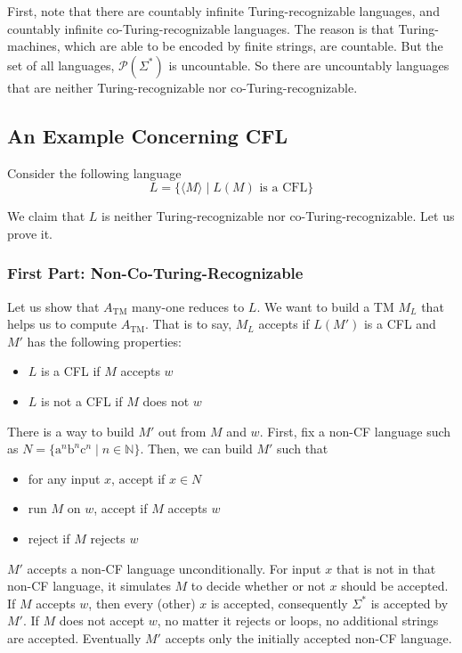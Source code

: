\documentclass[11pt]{article}
\begin{document}
First, note that there are countably infinite Turing-recognizable languages, and countably infinite
co-Turing-recognizable languages. The reason is that Turing-machines, which are able to be encoded
by finite strings, are countable. But the set of all languages, $\mathcal{P}(\Sigma^\ast)$ is
uncountable. So there are uncountably languages that are neither Turing-recognizable nor
co-Turing-recognizable.

\subsection{An Example Concerning CFL}

Consider the following language
\[
  L = \{\langle M \rangle \mid L(M) \text{ is a CFL}\}
\]

We claim that $L$ is neither Turing-recognizable nor co-Turing-recognizable. Let us prove it.

\subsubsection{First Part: Non-Co-Turing-Recognizable}

Let us show that $A_{\mathrm{TM}}$ many-one reduces to $L$. We want to build a TM $M_L$ that helps us to
compute $A_{\mathrm{TM}}$. That is to say, $M_L$ accepts if $L(M')$ is a CFL and $M'$ has the following
properties:
\begin{itemize}
\item $L$ is a CFL if $M$ accepts $w$
\item $L$ is not a CFL if $M$ does not $w$
\end{itemize}

There is a way to build $M'$ out from $M$ and $w$. First, fix a non-CF language such as
$N = \{\mathrm{a}^n\mathrm{b}^n\mathrm{c}^n \mid n \in \mathbb{N}\}$. Then, we can build $M'$ such that
\begin{itemize}
\item for any input $x$, accept if $x \in N$
\item run $M$ on $w$, accept if $M$ accepts $w$
\item reject if $M$ rejects $w$
\end{itemize}

$M'$ accepts a non-CF language unconditionally. For input $x$ that is not in that non-CF
language, it simulates $M$ to decide whether or not $x$ should be accepted. If $M$ accepts
$w$, then every (other) $x$ is accepted, consequently $\Sigma^\ast$ is accepted by $M'$.
If $M$ does not accept $w$, no matter it rejects or loops, no additional strings are
accepted. Eventually $M'$ accepts only the initially accepted non-CF language.
\end{document}
